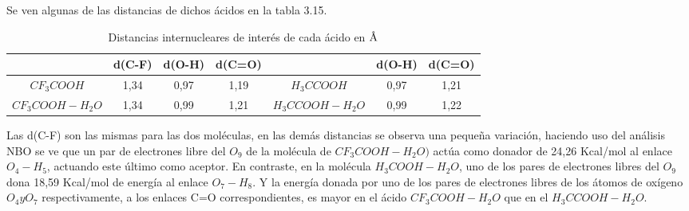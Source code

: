  Se ven algunas de las distancias de dichos ácidos en la tabla 3.15.
 \begin{table}[H]
 	\centering
 	\begin{tabular}{|c|c|c|c|c|c|c|}
 		\hline
 			 & d(C-F)	& d(O-H) & d(C=O) & & d(O-H) & d(C=O) \\ \hline
$CF_3COOH$ & 1,34 & 0,97 & 1,19 & $H_3CCOOH$ & 0,97 &1,21 \\ \hline $CF_3COOH-H_2O$	& 1,34 & 0,99 & 1,21 & $H_3CCOOH-H_2O$	& 0,99 &1,22 \\ \hline
 	\end{tabular}
 \caption{Distancias internucleares de interés de cada ácido en $\mbox{\normalfont\AA}$}
 \end{table}
Las d(C-F) son las mismas para las dos moléculas, en las demás distancias se observa una pequeña variación, haciendo uso del análisis NBO se ve que un par de electrones libre del $O_9$ de la molécula de $CF_3COOH-H_2O)$ actúa como donador de 24,26 Kcal/mol al enlace $O_4 - H_5$, actuando este último como aceptor. En contraste, en la molécula $H_3COOH-H_2O$, uno de los pares de electrones libres del $O_9$ dona 18,59 Kcal/mol de energía al enlace $O_7-H_8$. Y la energía donada por uno de los pares de electrones libres de los átomos de oxígeno $O_4 y O_7$ respectivamente, a los enlaces C=O correspondientes, es mayor en el ácido $CF_3COOH-H_2O$ que en el $H_3CCOOH-H_2O$.
